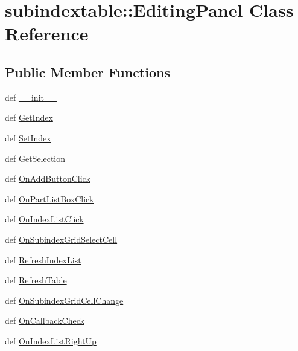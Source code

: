 \hypertarget{classsubindextable_1_1EditingPanel}{
\section{subindextable::Editing\-Panel Class Reference}
\label{classsubindextable_1_1EditingPanel}
}
\subsection*{Public Member Functions}
\begin{CompactItemize}
\item 
def \hyperlink{classsubindextable_1_1EditingPanel_487656ac452a6f151527114f2a095cb0}{\_\-\_\-init\_\-\_\-}
\item 
def \hyperlink{classsubindextable_1_1EditingPanel_7f59673c3d822f36c779243c03135262}{Get\-Index}
\item 
def \hyperlink{classsubindextable_1_1EditingPanel_bcf8af059e66a142de9427beecebf9da}{Set\-Index}
\item 
def \hyperlink{classsubindextable_1_1EditingPanel_a1f495ac1fcfb50274c9d72b19be5eff}{Get\-Selection}
\item 
def \hyperlink{classsubindextable_1_1EditingPanel_78884cdb11542dd4f1557b4aea4bb078}{On\-Add\-Button\-Click}
\item 
def \hyperlink{classsubindextable_1_1EditingPanel_f5b2fbab77fb18f61a0c664e78fc54c8}{On\-Part\-List\-Box\-Click}
\item 
def \hyperlink{classsubindextable_1_1EditingPanel_5a577219ca8e2423c9277349afd54de5}{On\-Index\-List\-Click}
\item 
def \hyperlink{classsubindextable_1_1EditingPanel_8fd8c0fe15b2c830156fb9c468caa961}{On\-Subindex\-Grid\-Select\-Cell}
\item 
def \hyperlink{classsubindextable_1_1EditingPanel_0c3755e29c0d8822d4ec8510ba2c0f43}{Refresh\-Index\-List}
\item 
def \hyperlink{classsubindextable_1_1EditingPanel_1dbdf790003c72bd91bc274308023697}{Refresh\-Table}
\item 
def \hyperlink{classsubindextable_1_1EditingPanel_77b31fc20f2e231fc7fa4d21932f6ece}{On\-Subindex\-Grid\-Cell\-Change}
\item 
def \hyperlink{classsubindextable_1_1EditingPanel_25f67e5b35c3e64b67a5f92efc3e72fc}{On\-Callback\-Check}
\item 
def \hyperlink{classsubindextable_1_1EditingPanel_ea60ec2e247df3ded2be05ad4f647d32}{On\-Index\-List\-Right\-Up}

\end{CompactItemize}
